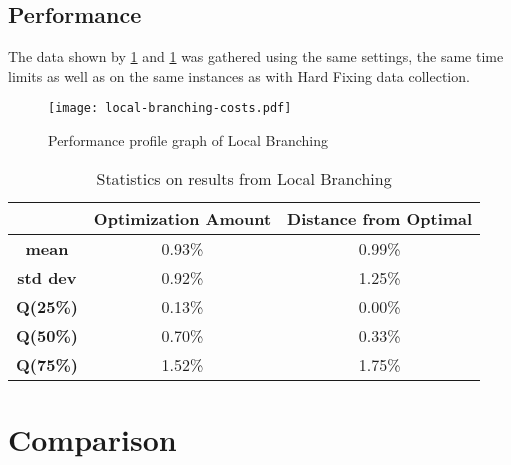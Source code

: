 \subsection{Performance}

The data shown by \figurename{ \ref{fig:localBranchingCost}} and \tablename{ \ref{tab:localBranchingStats}} was gathered using the same settings, the same time limits as well as on the same instances as with Hard Fixing data collection.

\begin{figure}[htbp]
	\centering
	\texttt{[image: local-branching-costs.pdf]}
	\caption{Performance profile graph of Local Branching\label{fig:localBranchingCost}}
\end{figure}

\begin{table}[htbp]
	\centering
	\begin{tabular}{c|c|c|}
        & \textbf{Optimization Amount} & \textbf{Distance from Optimal} \\
		\hline \textbf{mean} & 0.93\% & 0.99\% \\
		\hline \textbf{std dev} & 0.92\% & 1.25\% \\
        \hline \textbf{Q(25\%)} & 0.13\% & 0.00\% \\
        \hline \textbf{Q(50\%)} & 0.70\% & 0.33\% \\
        \hline \textbf{Q(75\%)} & 1.52\% & 1.75\% \\
	\end{tabular}
    \vspace{2mm}
	\caption{Statistics on results from Local Branching} \label{tab:localBranchingStats}
\end{table}

\section{Comparison}
